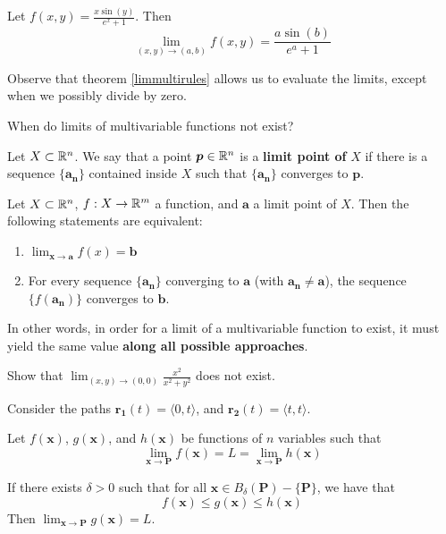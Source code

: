 \begin{example}
Let $f(x,y) = \frac{x\sin(y)}{e^x+1}$.  Then $$\lim_{(x,y) \to (a,b)}f(x,y) = \frac{a\sin(b)}{e^a+1}$$
\end{example}  
    
    Observe that theorem \ref{limmultirules} allows us to evaluate the limits, except when we possibly divide by zero.
    
  \begin{motivating}
  When do limits of multivariable functions not exist?
  \end{motivating}  
    
    \begin{definition}
    Let $X \subset \mathbb{R}^n$.  We say that a point $\bm{p} \in \mathbb{R}^n$ is a \textbf{limit point of} $X$ if there is a sequence $\{\bm{a_n}\}$ contained inside $X$ such that $\{\bm{a_n}\}$ converges to $\bm{p}$.    
    \end{definition}
        
    
    \begin{theorem}
     Let $X \subset \mathbb{R}^n$, $f : X \to \mathbb{R}^m$ a function, and $\bm{a}$ a limit point of $X$.  Then the following statements are equivalent:
     
     \begin{enumerate}
         \item $\lim_{\bm{x} \to \bm{a}}f(x) = \bm{b}$
         \item For every sequence $\{\bm{a_n}\}$ converging to $\bm{a}$ (with $\bm{a_n} \neq \bm{a}$), the sequence $\{f(\bm{a_n})\}$ converges to $\bm{b}$.
     \end{enumerate}
     
    \end{theorem}
    
    In other words, in order for a limit of a multivariable function to exist, it must yield the same value \textbf{along all possible approaches}.
    
    \begin{example}
    Show that $\lim_{(x,y) \to (0,0)} \frac{x^2}{x^2 + y^2}$ does not exist.
    
    Consider the paths $\bm{r_1}(t) = \langle 0, t \rangle$, and $\bm{r_2}(t) = \langle t, t \rangle$.
    \end{example}
    
    
    
    
    
    
    \begin{theorem}
    Let $f(\bm{x})$, $g(\bm{x})$, and $h(\bm{x})$ be functions of $n$ variables such that $$\lim_{\bm{x} \to \bm{P}}f(\bm{x}) = L = \lim_{\bm{x} \to \bm{P}}h(\bm{x})$$
    
    If there exists $\delta > 0$ such that for all $\bm{x} \in B_\delta(\bm{P}) - \{\bm{P}\}$, we have that $$f(\bm{x}) \leq g(\bm{x}) \leq h(\bm{x})$$ 
    Then $\lim_{\bm{x} \to \bm{P}}g(\bm{x}) = L$.
    \end{theorem}
    
